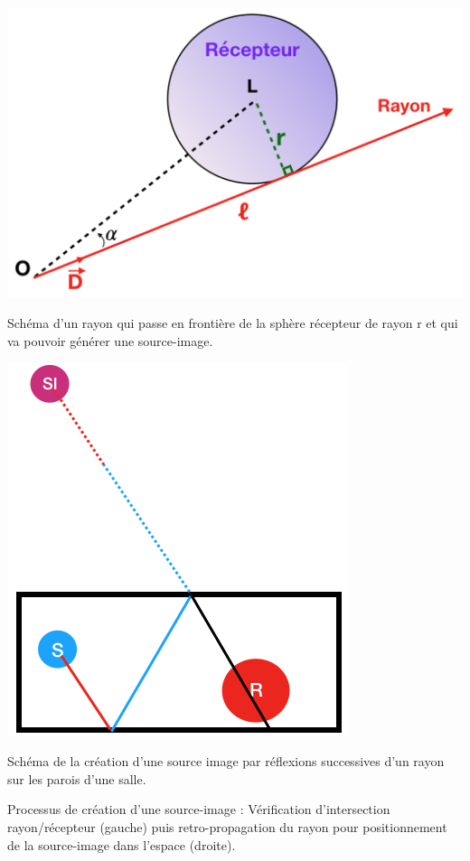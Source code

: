 \begin{figureth}
	\begin{subfigureth}{0.55\textwidth}
			\includegraphics[width=\linewidth]{images/touche}
			\caption{Schéma d'un rayon qui passe en frontière de la sphère récepteur de rayon r et qui va pouvoir générer une source-image.}
			\label{touche}
		\end{subfigureth}
		\qquad
		\begin{subfigureth}{0.35\textwidth}
			\includegraphics[width=\linewidth]{images/schema_SI}
			\caption{Schéma de la création d'une source image par réflexions successives d'un rayon sur les parois d'une salle.}
			\label{schema_SI}
	\end{subfigureth}
	\caption{Processus de création d'une source-image : Vérification d'intersection rayon/récepteur (gauche) puis retro-propagation du rayon pour positionnement de la source-image dans l'espace (droite).}
\end{figureth}
